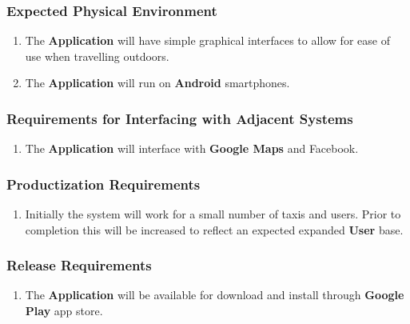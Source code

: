 \documentclass[english]{article}
\begin{document}
\subsubsection{Expected Physical Environment}
\label{ssub:expected_physical_environment}
\begin{enumerate}[{EPE}1. ]
	\item The \textbf{Application} will have simple graphical interfaces to allow for ease of use when travelling outdoors.
	\item The \textbf{Application} will run on  \textbf{Android} smartphones.
\end{enumerate}

\subsubsection{Requirements for Interfacing with Adjacent Systems}
\label{ssub:requirements_for_interfacing_with_adjacent_systems}
\begin{enumerate}[{RIAS}1. ]
	\item The \textbf{Application} will interface with \textbf{Google Maps} and Facebook.
\end{enumerate}

\subsubsection{Productization Requirements}
\label{ssub:productization_requirements}
\begin{enumerate}[{PR}1. ]
	\item Initially the system will work for a small number of taxis and users. Prior to completion this will be increased to reflect an expected expanded \textbf{User} base.
\end{enumerate}

\subsubsection{Release Requirements}
\label{ssub:release_requirements}
\begin{enumerate}[{RR}1. ]
	\item The \textbf{Application} will be available for download and install through \textbf{Google Play} app store.
\end{enumerate}
\end{document}
